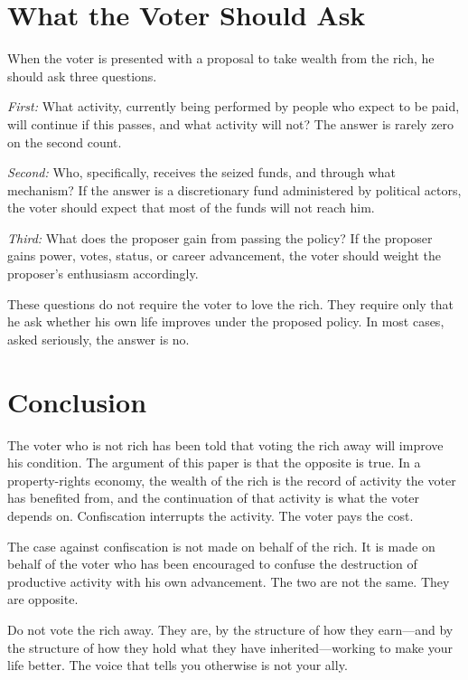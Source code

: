 \documentclass[11pt]{article}
\begin{document}
\section{What the Voter Should Ask}

When the voter is presented with a proposal to take wealth from the rich, he should ask three questions.

\emph{First:} What activity, currently being performed by people who expect to be paid, will continue if this passes, and what activity will not? The answer is rarely zero on the second count.

\emph{Second:} Who, specifically, receives the seized funds, and through what mechanism? If the answer is a discretionary fund administered by political actors, the voter should expect that most of the funds will not reach him.

\emph{Third:} What does the proposer gain from passing the policy? If the proposer gains power, votes, status, or career advancement, the voter should weight the proposer's enthusiasm accordingly.

These questions do not require the voter to love the rich. They require only that he ask whether his own life improves under the proposed policy. In most cases, asked seriously, the answer is no.

\section{Conclusion}

The voter who is not rich has been told that voting the rich away will improve his condition. The argument of this paper is that the opposite is true. In a property-rights economy, the wealth of the rich is the record of activity the voter has benefited from, and the continuation of that activity is what the voter depends on. Confiscation interrupts the activity. The voter pays the cost.

The case against confiscation is not made on behalf of the rich. It is made on behalf of the voter who has been encouraged to confuse the destruction of productive activity with his own advancement. The two are not the same. They are opposite.

Do not vote the rich away. They are, by the structure of how they earn---and by the structure of how they hold what they have inherited---working to make your life better. The voice that tells you otherwise is not your ally.
\end{document}
